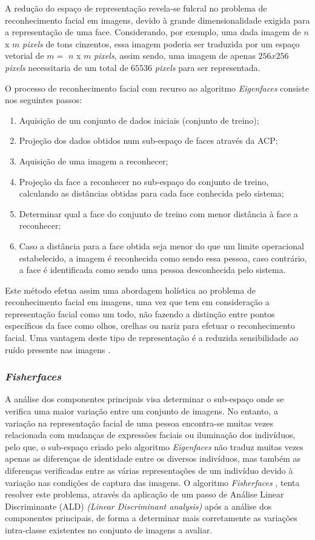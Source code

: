 A redução do espaço de representação revela-se fulcral no problema de reconhecimento facial em imagens, devido à grande dimensionalidade exigida para a representação de uma face. Considerando, por exemplo, uma dada imagem de $n$ x $m$ \textit{pixels} de tons cinzentos, essa imagem poderia ser traduzida por um espaço vetorial de $m = $ $n$ x $m$ \textit{pixels}, assim sendo, uma imagem de apenas $256x256$ \textit{pixels} necessitaria de um total de $65536$ \textit{pixels} para ser representada.

O processo de reconhecimento facial com recurso ao algoritmo \textit{Eigenfaces} consiste nos seguintes passos:
\begin{enumerate}
\item Aquisição de um conjunto de dados iniciais (conjunto de treino);
\item Projeção dos dados obtidos num sub-espaço de faces através da ACP;
\item Aquisição de uma imagem a reconhecer;
\item Projeção da face a reconhecer no sub-espaço do conjunto de treino, calculando as distâncias obtidas para cada face conhecida pelo sistema;
\item Determinar qual a face do conjunto de treino com menor distância à face a reconhecer;
\item Caso a distância para a face obtida seja menor do que um limite operacional estabelecido, a imagem é reconhecida como sendo essa pessoa, caso contrário, a face é identificada como sendo uma pessoa desconhecida pelo sistema.
\end{enumerate}

Este método efetua assim uma abordagem holística ao problema de reconhecimento facial em imagens, uma vez que tem em consideração a representação facial como um todo, não fazendo a distinção entre pontos específicos da face como olhos, orelhas ou nariz para efetuar o reconhecimento facial. Uma vantagem deste tipo de representação é a reduzida sensibilidade ao ruído presente nas imagens \cite{Zhao2003}.

\subsubsection*{\textit{Fisherfaces}}
A análise dos componentes principais visa determinar o sub-espaço onde se verifica uma maior variação entre um conjunto de imagens. No entanto, a variação na representação facial de uma pessoa encontra-se muitas vezes relacionada com mudanças de expressões faciais ou iluminação dos indivíduos, pelo que, o sub-espaço criado pelo algoritmo \textit{Eigenfaces} não traduz muitas vezes apenas as diferenças de identidade entre os diversos indivíduos, mas também as diferenças verificadas entre as várias representações de um indivíduo devido à variação nas condições de captura das imagens. O algoritmo \textit{Fisherfaces} \cite{Belhumeur1997, Etemad1997, Zhao1998}, tenta resolver este problema, através da aplicação de um passo de Análise Linear Discriminante (ALD) \textit{(Linear Discriminant analysis)} após a análise dos componentes principais, de forma a determinar mais corretamente as variações intra-classe existentes no conjunto de imagens a avaliar.

